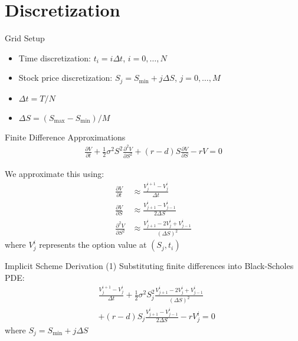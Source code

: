 \documentclass{beamer}
\begin{document}
\section{Discretization}
\begin{frame}{Grid Setup}
    \begin{itemize}
        \item Time discretization: $t_i = i\Delta t$, $i = 0,\ldots,N$
        \item Stock price discretization: $S_j = S_{\text{min}} + j\Delta S$, $j = 0,\ldots,M$
        \item $\Delta t = T/N$
        \item $\Delta S = (S_{\text{max}}-S_{\text{min}})/M$
    \end{itemize}
    \begin{center}
    \end{center}
\end{frame}

\begin{frame}{Finite Difference Approximations}
    \begin{align*}
        \frac{\partial V}{\partial t} + \frac{1}{2}\sigma^2S^2\frac{\partial^2 V}{\partial S^2} + (r-d)S\frac{\partial V}{\partial S} - rV = 0
    \end{align*}
    
    We approximate this using:
    \begin{align*}
        \frac{\partial V}{\partial t} &\approx \frac{V_j^{i+1} - V_j^i}{\Delta t} \\
        \frac{\partial V}{\partial S} &\approx \frac{V_{j+1}^i - V_{j-1}^i}{2\Delta S} \\
        \frac{\partial^2 V}{\partial S^2} &\approx \frac{V_{j+1}^i - 2V_j^i + V_{j-1}^i}{(\Delta S)^2}
    \end{align*}
    where $V_j^i$ represents the option value at $(S_j, t_i)$
\end{frame}

\begin{frame}{Implicit Scheme Derivation (1)}
    Substituting finite differences into Black-Scholes PDE:
    \begin{align*}
        &\frac{V_j^{i+1} - V_j^i}{\Delta t} + \frac{1}{2}\sigma^2S_j^2\frac{V_{j+1}^i - 2V_j^i + V_{j-1}^i}{(\Delta S)^2} \\
        &+ (r-d)S_j\frac{V_{j+1}^i - V_{j-1}^i}{2\Delta S} - rV_j^i = 0
    \end{align*}
    where $S_j = S_{\text{min}} + j\Delta S$
\end{frame}
\end{document}
